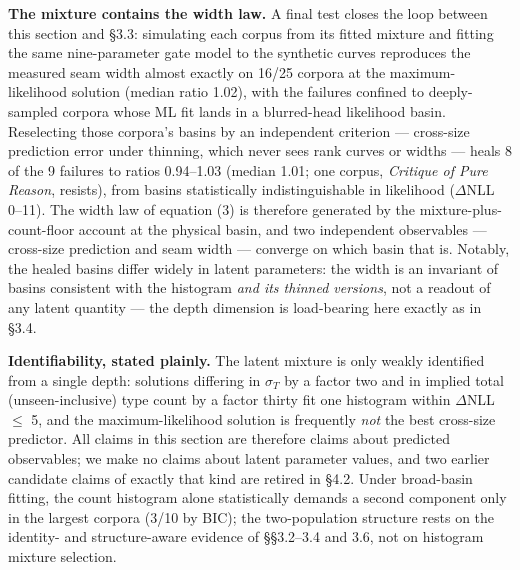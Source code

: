 \documentclass[11pt]{article}
\begin{document}
\textbf{The mixture contains the width law.} A final test closes the loop between this section and \S3.3: simulating each corpus from its fitted mixture and fitting the same nine-parameter gate model to the synthetic curves reproduces the measured seam width almost exactly on 16/25 corpora at the maximum-likelihood solution (median ratio 1.02), with the failures confined to deeply-sampled corpora whose ML fit lands in a blurred-head likelihood basin. Reselecting those corpora's basins by an independent criterion --- cross-size prediction error under thinning, which never sees rank curves or widths --- heals 8 of the 9 failures to ratios 0.94--1.03 (median 1.01; one corpus, \emph{Critique of Pure Reason}, resists), from basins statistically indistinguishable in likelihood ($\Delta$NLL 0--11). The width law of equation (3) is therefore generated by the mixture-plus-count-floor account at the physical basin, and two independent observables --- cross-size prediction and seam width --- converge on which basin that is. Notably, the healed basins differ widely in latent parameters: the width is an invariant of basins consistent with the histogram \emph{and its thinned versions}, not a readout of any latent quantity --- the depth dimension is load-bearing here exactly as in \S3.4.

\textbf{Identifiability, stated plainly.} The latent mixture is only weakly identified from a single depth: solutions differing in $\sigma_T$ by a factor two and in implied total (unseen-inclusive) type count by a factor thirty fit one histogram within $\Delta$NLL $\le$ 5, and the maximum-likelihood solution is frequently \emph{not} the best cross-size predictor. All claims in this section are therefore claims about predicted observables; we make no claims about latent parameter values, and two earlier candidate claims of exactly that kind are retired in \S4.2. Under broad-basin fitting, the count histogram alone statistically demands a second component only in the largest corpora (3/10 by BIC); the two-population structure rests on the identity- and structure-aware evidence of \S\S3.2--3.4 and 3.6, not on histogram mixture selection.
\end{document}
